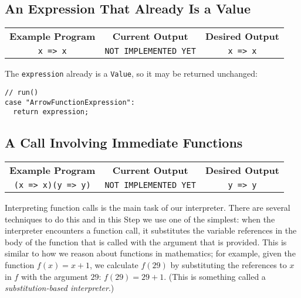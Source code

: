 \documentclass[12pt, oneside]{book}
\begin{document}
\subsection{An Expression That Already Is a Value}
\label{An Expression That Already Is a Value}

\begin{center}
\begin{tabular}{c|c|c}
\textbf{Example Program} & \textbf{Current Output} & \textbf{Desired Output} \\
\texttt{x => x} & \texttt{NOT IMPLEMENTED YET} & \texttt{x => x} \\
\end{tabular}
\end{center}

\noindent The \texttt{expression} already is a \texttt{Value}, so it may be returned unchanged:

\begin{verbatim}
// run()
case "ArrowFunctionExpression":
  return expression;
\end{verbatim}

\subsection{A Call Involving Immediate Functions}
\label{A Call Involving Immediate Functions}

\begin{center}
\begin{tabular}{c|c|c}
\textbf{Example Program} & \textbf{Current Output} & \textbf{Desired Output} \\
\texttt{(x => x)(y => y)} & \texttt{NOT IMPLEMENTED YET} & \texttt{y => y} \\
\end{tabular}
\end{center}

\noindent Interpreting function calls is the main task of our interpreter. There are several techniques to do this and in this Step we use one of the simplest: when the interpreter encounters a function call, it substitutes the variable references in the body of the function that is called with the argument that is provided. This is similar to how we reason about functions in mathematics; for example, given the function $f(x) = x + 1$, we calculate $f(29)$ by substituting the references to $x$ in $f$ with the argument $29$: $f(29) = 29 + 1$. (This is something called a \emph{substitution-based interpreter}.)
\end{document}
